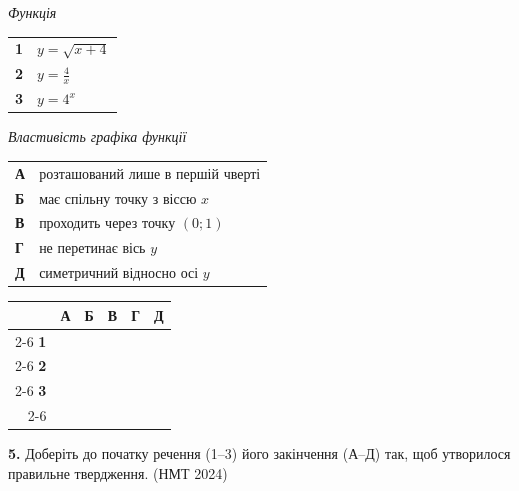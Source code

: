 \documentclass[14pt]{extarticle}
\newcommand{\answerGrid}{
    \begingroup
    \setlength{\tabcolsep}{4pt}
    \renewcommand{\arraystretch}{1.2}
    \small
    \begin{tabular}{r|c|c|c|c|c|}
         \multicolumn{1}{c}{} & \multicolumn{1}{c}{\textbf{А}} & \multicolumn{1}{c}{\textbf{Б}} & \multicolumn{1}{c}{\textbf{В}} & \multicolumn{1}{c}{\textbf{Г}} & \multicolumn{1}{c}{\textbf{Д}} \\ \cline{2-6}
         \textbf{1} & & & & & \\ \cline{2-6}
         \textbf{2} & & & & & \\ \cline{2-6}
         \textbf{3} & & & & & \\ \cline{2-6}
    \end{tabular}
    \endgroup
}
\newcommand{\nmtyear}[1]{\hfill{\small\color{yearcolor}(НМТ #1)}}
\begin{document}
\noindent
\begin{minipage}[t]{0.25\textwidth}
    \textit{Функція} \par \vspace{0.2cm}
    \begin{tabular}{@{}p{0.5cm} l@{}}
    \textbf{1} & $y = \sqrt{x + 4}$ \\[0.4cm]
    \textbf{2} & $y = \displaystyle\frac{4}{x}$ \\[0.5cm]
    \textbf{3} & \colorbox{yellow!30}{$y = 4^x$} \\
    \end{tabular}
\end{minipage}%
\hfill
\begin{minipage}[t]{0.45\textwidth}
    \textit{Властивість графіка функції} \par \vspace{0.2cm}
    \begin{tabular}{@{}p{0.5cm} p{6.5cm}@{}}
    \textbf{А} & розташований лише в першій чверті \\[0.2cm]
    \textbf{Б} & має спільну точку з віссю $x$ \\[0.2cm]
    \textbf{В} & проходить через точку $(0; 1)$ \\[0.2cm]
    \textbf{Г} & не перетинає вісь $y$ \\[0.2cm]
    \textbf{Д} & симетричний відносно осі $y$ \\
    \end{tabular}
\end{minipage}%
\hfill
\begin{minipage}[t]{0.25\textwidth}
    \raggedleft
    \answerGrid
\end{minipage}
\vspace{0.7cm}

\noindent\textbf{5.} Доберіть до початку речення (1–3) його закінчення (А–Д) так, щоб утворилося правильне твердження. \nmtyear{2024}
\vspace{0.3cm}
\end{document}
